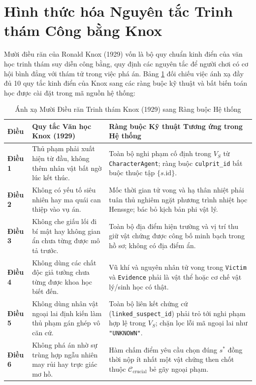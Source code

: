 \section{Hình thức hóa Nguyên tắc Trinh thám Công bằng Knox}
\label{sec:theory_knox}

Mười điều răn của Ronald Knox (1929) \cite{knox1929ten} vốn là bộ quy chuẩn kinh điển của văn học trinh thám suy diễn công bằng, quy định các nguyên tắc để người chơi có cơ hội bình đẳng với thám tử trong việc phá án. Bảng \ref{tab:knox_formalization} đối chiếu việc ánh xạ đầy đủ 10 quy tắc kinh điển của Knox sang các ràng buộc kỹ thuật và bất biến toán học được cài đặt trong mã nguồn hệ thống:

\begin{table}[H]
\centering
\small
\caption{Ánh xạ Mười Điều răn Trinh thám Knox (1929) sang Ràng buộc Hệ thống}
\label{tab:knox_formalization}
\begin{tabularx}{\textwidth}{p{1.4cm} p{5.6cm} X}
\toprule
\textbf{Điều} & \textbf{Quy tắc Văn học Knox (1929)} & \textbf{Ràng buộc Kỹ thuật Tương ứng trong Hệ thống} \\
\midrule
\textbf{Điều 1} & Thủ phạm phải xuất hiện từ đầu, không thêm nhân vật bất ngờ lúc kết thúc. & Toàn bộ nghi phạm cố định trong $V_S$ từ \texttt{CharacterAgent}; ràng buộc \texttt{culprit\_id} bắt buộc thuộc tập $\{s.\text{id}\}$. \\
\textbf{Điều 2} & Không có yếu tố siêu nhiên hay ma quái can thiệp vào vụ án. & Mốc thời gian tử vong và hạ thân nhiệt phải tuân thủ nghiêm ngặt phương trình nhiệt học Henssge; bác bỏ kịch bản phi vật lý. \\
\textbf{Điều 3} & Không che giấu lối đi bí mật hay không gian ẩn chưa từng được mô tả trước. & Toàn bộ địa điểm hiện trường và vị trí thu giữ vật chứng được công bố minh bạch trong hồ sơ; không có địa điểm ẩn. \\
\textbf{Điều 4} & Không dùng các chất độc giả tưởng chưa từng được khoa học biết đến. & Vũ khí và nguyên nhân tử vong trong \texttt{Victim} và \texttt{Evidence} phải là vật thể hoặc cơ chế vật lý/sinh học có thật. \\
\textbf{Điều 5} & Không dùng nhân vật ngoại lai định kiến làm thủ phạm gán ghép vô căn cứ. & Toàn bộ liên kết chứng cứ (\texttt{linked\_suspect\_id}) phải trỏ tới nghi phạm hợp lệ trong $V_S$; chặn lọc lỗi mã ngoại lai như \texttt{"UNKNOWN"}. \\
\textbf{Điều 6} & Không phá án nhờ sự trùng hợp ngẫu nhiên may rủi hay trực giác mơ hồ. & Hàm chấm điểm yêu cầu chọn đúng $s^*$ đồng thời nộp ít nhất một vật chứng then chốt thuộc $\mathcal{C}_{\text{crucial}}$ bẻ gãy ngoại phạm. \\

\end{tabularx}
\end{table}
